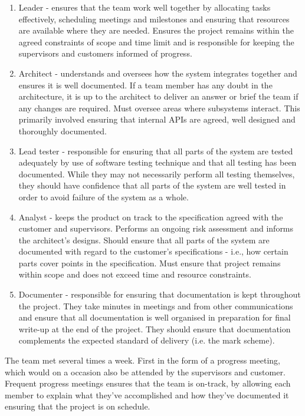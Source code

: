 \begin{enumerate}
\item Leader - ensures that the team work well together by allocating tasks effectively, scheduling meetings and milestones and ensuring that resources are available where they are needed. Ensures the project remains within the agreed constraints of scope and time limit and is responsible for keeping the supervisors and customers informed of progress.
\item Architect - understands and oversees how the system integrates together and ensures it is well documented. If a team member has any doubt in the architecture, it is up to the architect to deliver an answer or brief the team if any changes are required. Must oversee areas where subsystems interact. This primarily involved ensuring that internal APIs are agreed, well designed and thoroughly documented.
\item Lead tester - responsible for ensuring that all parts of the system are tested adequately by use of software testing technique and that all testing has been documented. While they may not necessarily perform all testing themselves, they should have confidence that all parts of the system are well tested in order to avoid failure of the system as a whole.
\item Analyst - keeps the product on track to the specification agreed with the customer and supervisors. Performs an ongoing risk assessment and informs the architect's designs. Should ensure that all parts of the system are documented with regard to the customer's specifications - i.e., how certain parts cover points in the specification. Must ensure that project remains within scope and does not exceed time and resource constraints.
\item Documenter - responsible for ensuring that documentation is kept throughout the project. They take minutes in meetings and from other communications and ensure that all documentation is well organised in preparation for final write-up at the end of the project. They should ensure that documentation complements the expected standard of delivery (i.e. the mark scheme).
\end{enumerate}

The team met several times a week. First in the form of a progress meeting, which would on a occasion also be attended by the supervisors and customer. Frequent progress meetings ensures that the team is on-track, by allowing each member to explain what they've accomplished and how they've documented it ensuring that the project is on schedule.
 
